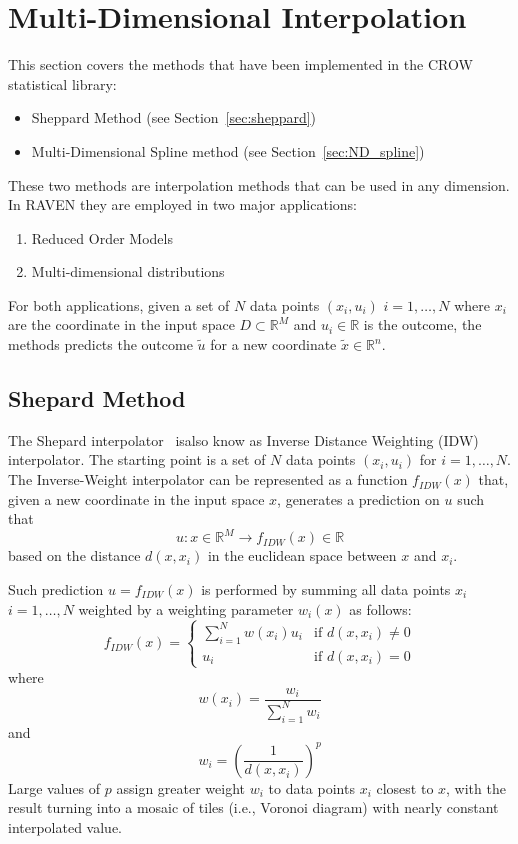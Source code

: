 \section{Multi-Dimensional Interpolation}
\label{sec:MD_interp}

This section covers the methods that have been implemented in the CROW statistical library:
\begin{itemize}
\item Sheppard Method (see Section~\ref{sec:sheppard})
\item Multi-Dimensional Spline method (see Section~\ref{sec:ND_spline})
\end{itemize}

These two methods are interpolation methods that can be used in any dimension.
In RAVEN they are employed in two major applications:
\begin{enumerate}
\item Reduced Order Models
\item Multi-dimensional distributions
\end{enumerate}
For both applications, given a set of $N$ data points $ (x_i,u_i )$  $i=1,\ldots,N$ where $x_i$ are the coordinate in the input space $D \subset \mathbb{R}^M$ and $u_i \in \mathbb{R}$ is the outcome, the methods predicts the outcome $\tilde{u}$ for a new coordinate $\tilde{x}\in \mathbb{R}^n$.


\subsection{Shepard Method}
\label{sec:shepard}
The Shepard interpolator~\cite{Shepard} isalso know as Inverse Distance Weighting (IDW) interpolator. 
The starting point is a set of $N$ data points $ (x_i,u_i )$ for $i=1,\ldots,N$. 
The Inverse-Weight interpolator can be represented as a function $f_{IDW}(x)$ that, given a new coordinate in the input space $x$, generates a prediction on $u$ such that 
\begin{equation}
u:x \in \mathbb{R}^M \rightarrow f_{IDW}(x) \in \mathbb{R}
\end{equation}
based on the distance $d(x,x_i)$ in the euclidean space between $x$ and $x_i$.

Such prediction $u=f_{IDW}(x)$ is performed by summing all data points $x_i$ $i=1,\ldots,N$ weighted by a weighting parameter $w_i (x)$ as follows:
\begin{equation}
f_{IDW}(x) = 
\left\{
\begin{matrix}
\sum_{i=1}^{N} w(x_i) u_i &  \text{if } d(x,x_i) \neq 0 \\
 u_i &  \text{if } d(x,x_i) = 0
\end{matrix}\right.
\end{equation}
where
\begin{equation}
w(x_i) =\frac{w_i}{\sum_{i=1}^{N} w_i}
\end{equation}
and
\begin{equation}
w_i = \left ( \frac{1}{d(x,x_i)} \right )^p
\end{equation}
Large values of $p$ assign greater weight $w_i$ to data points $x_i$ closest to $x$, with the result turning into a mosaic of tiles (i.e., Voronoi diagram) with nearly constant interpolated value.

